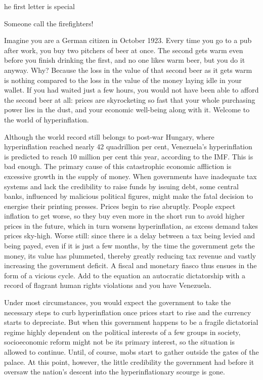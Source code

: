 \label{ch:venezuelan-hyperinflation}

he first letter is special


Someone call the firefighters!


   Imagine you are a German citizen in October 1923. Every time you go to
   a pub after work, you buy two pitchers of beer at once. The second gets
   warm even before you finish drinking the first, and no one likes warm
   beer, but you do it anyway. Why? Because the loss in the value of that
   second beer as it gets warm is nothing compared to the loss in the
   value of the money laying idle in your wallet. If you had waited just a
   few hours, you would not have been able to afford the second beer at
   all: prices are skyrocketing so fast that your whole purchasing power
   lies in the dust, and your economic well-being along with it. Welcome
   to the world of hyperinflation.

   Although the world record still belongs to post-war Hungary, where
   hyperinflation reached nearly 42 quadrillion per cent, Venezuela's
   hyperinflation is predicted to reach 10 million per cent this year,
   according to the IMF. This is bad enough. The primary cause of this
   catastrophic economic affliction is excessive growth in the supply of
   money. When governments have inadequate tax systems and lack the
   credibility to raise funds by issuing debt, some central banks,
   influenced by malicious political figures, might make the fatal
   decision to energise their printing presses. Prices begin to rise
   abruptly. People expect inflation to get worse, so they buy even more
   in the short run to avoid higher prices in the future, which in turn
   worsens hyperinflation, as excess demand takes prices sky-high. Worse
   still: since there is a delay between a tax being levied and being
   payed, even if it is just a few months, by the time the government gets
   the money, its value has plummeted, thereby greatly reducing tax
   revenue and vastly increasing the government deficit. A fiscal and
   monetary fiasco thus ensues in the form of a vicious cycle. Add to the
   equation an autocratic dictatorship with a record of flagrant human
   rights violations and you have Venezuela.

   Under most circumstances, you would expect the government to take the
   necessary steps to curb hyperinflation once prices start to rise and
   the currency starts to depreciate. But when this government happens to
   be a fragile dictatorial regime highly dependent on the political
   interests of a few groups in society, socioeconomic reform might not be
   its primary interest, so the situation is allowed to continue. Until,
   of course, mobs start to gather outside the gates of the palace. At
   this point, however, the little credibility the government had before
   it oversaw the nation's descent into the hyperinflationary scourge is
   gone.

